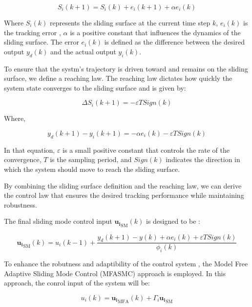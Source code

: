 \documentclass[journal,onecolumn]{IEEEtran}
\begin{document}
\begin{equation}
    \label{model eq:sms}
    S_i(k+1) = S_i(k)+e_i(k+1)+\alpha e_i(k) 
\end{equation}

Where \(S_i(k)\) represents the sliding surface at the current time step \(k\), \(e_i(k)\) is the tracking error , \(\alpha\) is a positive constant that influences the dynamics of the sliding surface. The error \(e_i(k)\) is defined as the difference between the desired output \(y_d(k)\) and the actual output \(y_i(k)\).

To ensure that the systm's trajectory is driven toward and remains on the sliding surface, we define a reaching law. The reaching law dictates how quickly the system state converges to the sliding surface and is given by:

\begin{equation}
    \label{model eq:reaching_law}
    \Delta S_i(k+1) = - \varepsilon T Sign(k) 
\end{equation}

Where,

\begin{equation}
    \label{model 13}
    y_d(k+1) - y_i(k+1) = - \alpha e_i(k) - \varepsilon T Sign(k) 
\end{equation}


In that equation, \(\varepsilon\) is a small positive constant that controls the rate of the convergence, \(T\) is the sampling period, and \(Sign(k)\) indicates the direction in which the system should move to reach the sliding surface.

By combining the sliding surface definition and the reaching law, we can derive the control law that ensures the desired tracking performance while maintaining robustness.

The final sliding mode control input \(\mathbf{u_i}_{\text{SM}}(k)\) is designed to be :

\begin{equation}
    \label{model eq:smc}
    \mathbf{u_i}_{\text{SM}}(k) = u_i(k-1) + \frac{y_d(k+1)-y(k) + \alpha e_i(k) + \varepsilon T Sign(k)}{\phi_i(k)}
\end{equation}

To enhance the robutness and adaptibility of the control system , the Model Free Adaptive Sliding Mode Control (MFASMC) approach is employed. In this approach, the conrol input of the system will be:

\begin{equation}
    \label{model eq:mfasmc}
    u_i(k) = \mathbf{u_i}_{\text{MFA}}(k) + \Gamma_i \mathbf{u_i}_{\text{SM}}
\end{equation}
\end{document}
